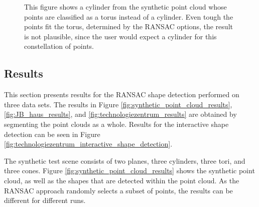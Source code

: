 \begin{figure}[h]
\centering
{}%
{}      
\caption{This figure shows a cylinder from the synthetic point cloud whose points are classified as a torus instead of a cylinder. Even tough the points fit the torus, determined by the RANSAC options, the result is not plausible, since the user would expect a cylinder for this constellation of points. }
\label{fig:missfittedTorus}
\end{figure}


\subsection{Results}

This section presents results for the RANSAC shape detection performed on three data sets. The results in Figure \ref{fig:synthetic_point_cloud_results}, \ref{fig:JB_haus_results}, and \ref{fig:technologiezentrum_results} are obtained by segmenting the point clouds as a whole. Results for the interactive shape detection can be seen in Figure \ref{fig:technologiezentrum_interactive_shape_detection}. 

The synthetic test scene consists of two planes, three cylinders, three tori, and three cones.  Figure \ref{fig:synthetic_point_cloud_results} shows the synthetic point cloud, as well as the shapes that are detected within the point cloud. As the RANSAC approach randomly selects a subset of points, the results can be different for different runs. 


